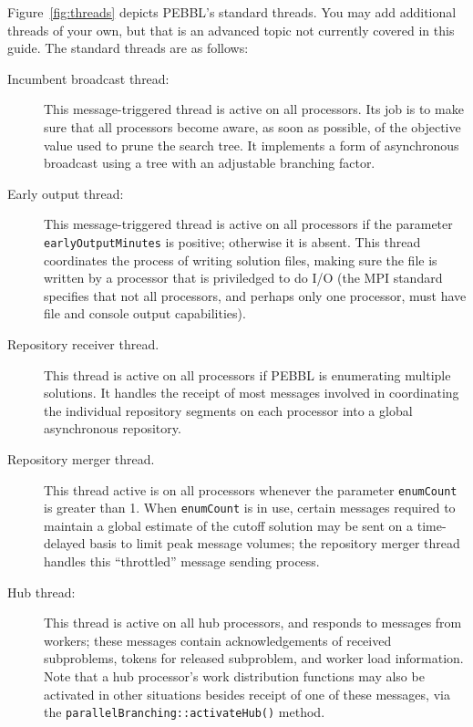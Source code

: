 Figure~\ref{fig:threads} depicts PEBBL's standard threads. You may add
additional threads of your own, but that is an advanced topic not
currently covered in this guide.  The standard threads are as follows:

\begin{description}

\item[Incumbent broadcast thread:] This message-triggered thread is
  active on all processors.  Its job is to make sure that all
  processors become aware, as soon as possible, of the objective value
  used to prune the search tree.  It implements a form of
  asynchronous broadcast using a tree with an adjustable branching
  factor.

\item[Early output thread:] This message-triggered thread is active on
  all processors if the parameter \texttt{earlyOutputMinutes} is
  positive; otherwise it is absent. This thread coordinates the
  process of writing solution files, making sure the file is written
  by a processor that is priviledged to do I/O (the MPI standard
  specifies that not all processors, and perhaps only one processor,
  must have file and console output capabilities).

\item[Repository receiver thread.]  This thread is active on all
  processors if PEBBL is enumerating multiple solutions.  It handles
  the receipt of most messages involved in coordinating the individual
  repository segments on each processor into a global asynchronous
  repository.

\item[Repository merger thread.]  This thread active is on all
  processors whenever the parameter \texttt{enumCount} is greater than
  1.  When \texttt{enumCount} is in use, certain messages required to
  maintain a global estimate of the cutoff solution may be sent on a
  time-delayed basis to limit peak message volumes; the repository
  merger thread handles this ``throttled'' message sending process.

\item[Hub thread:]  This thread is active on all hub processors, and
  responds to messages from workers; these messages contain
  acknowledgements of received subproblems, tokens for released
  subproblem, and worker load information.  Note that a hub
  processor's work distribution functions may also be activated in
  other situations besides receipt of one of these messages, via the
  \texttt{parallelBranching::activateHub()} method. 


\end{description}
